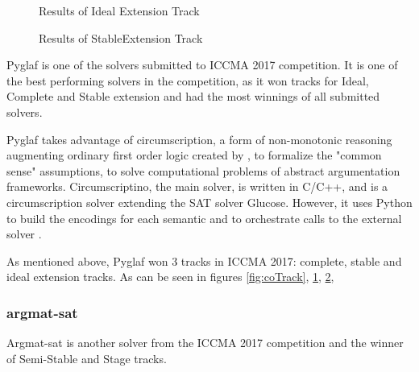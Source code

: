 \begin{figure}
	\centering
	
	\caption{Results of Ideal Extension Track}
	\label{fig:idTrack}
	
\end{figure}

\begin{figure}
	\centering
	
	\caption{Results of StableExtension Track}
	\label{fig:stTrack}
\end{figure}
Pyglaf is one of the solvers submitted to ICCMA 2017 competition. It is one of the best performing solvers in the competition, as it won tracks for Ideal, Complete and Stable extension and had the most winnings of all submitted solvers.

Pyglaf takes advantage of circumscription, a form of non-monotonic reasoning augmenting ordinary first order logic created by \citet{circumpscription}, to formalize the "common sense" assumptions, to solve computational problems of abstract argumentation frameworks.  Circumscriptino, the main solver, is written in C/C++, and is a circumscription solver extending the SAT solver Glucose. However, it uses Python to build the encodings for each semantic and to orchestrate calls to the external solver \citep{pyglaf}. 

As mentioned above, Pyglaf won 3 tracks in ICCMA 2017: complete, stable and ideal extension tracks. As can be seen in figures \ref{fig:coTrack}, \ref{fig:idTrack}, \ref{fig:stTrack}, 

\subsubsection{argmat-sat}
Argmat-sat is another solver from the ICCMA 2017 competition and the winner of Semi-Stable and Stage tracks.
